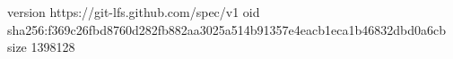 version https://git-lfs.github.com/spec/v1
oid sha256:f369c26fbd8760d282fb882aa3025a514b91357e4eacb1eca1b46832dbd0a6cb
size 1398128

